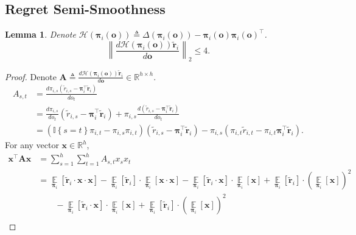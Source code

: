 \documentclass[10pt]{article}
\def\rvo{{\mathbf{o}}}
\def\rvx{{\mathbf{x}}}
\def\rvo{{\mathbf{o}}}
\def\rvtilder{{\tilde{\mathbf{r}}}}
\newtheorem{lem}{Lemma}
\def\rvpi{{\boldsymbol{\pi}}}
\def\rmA{{\mathbf{A}}}
\def\sE{{\mathbb{E}}}
\def\sR{{\mathbb{R}}}
\def\sI{{\mathbb{I}}}
\def\gH{{\mathcal{H}}}
\DeclareMathOperator*{\expectation}{\sE}
\begin{document}
\subsection{Regret Semi-Smoothness}

\begin{lem}
    Denote $\gH\left( \rvpi_i \left(\rvo \right) \right) \triangleq \Delta \left( \rvpi_i \left(\rvo \right) \right) - \rvpi_i \left(\rvo \right) \rvpi_i \left(\rvo \right)^\top$.
\begin{equation*}
    \left\| \frac{d \gH\left( \rvpi_i \left(\rvo \right) \right) \rvtilder_i}{d \rvo } \right\|_2 \le 4.
\end{equation*}
\end{lem}
\begin{proof}
    Denote $\rmA \triangleq \frac{d \gH\left( \rvpi_i \left(\rvo \right) \right) \rvtilder_i}{d \rvo } \in \sR^{h \times h}$.
\begin{equation*}
\begin{split}
    A_{s, t} &= \frac{d \pi_{i,s} \left( \tilde{r}_{i,s} - \rvpi_i^\top \rvtilder_i \right) }{d o_t} \\
    &= \frac{d \pi_{i,s} }{d o_t} \left( \tilde{r}_{i,s} - \rvpi_i^\top \rvtilder_i \right) + \pi_{i,s} \frac{d \left( \tilde{r}_{i,s} - \rvpi_i^\top \rvtilder_i \right) }{d o_t} \\
    &=\left ( \sI\left\{ s = t\right\} \pi_{i,t} -  \pi_{i,s } \pi_{i,t} \right) \left( \tilde{r}_{i,s} - \rvpi_i^\top \rvtilder_i \right) - \pi_{i,s} \left( \pi_{i,t} \tilde{r}_{i,t} - \pi_{i,t} \rvpi_i^\top \rvtilder_i \right).
\end{split}
\end{equation*}
For any vector $\rvx \in \sR^h$, 
\begin{equation*}
\begin{split}
    \rvx^\top \rmA \rvx &= \sum\limits_{s=1}^{h}{ \sum\limits_{t=1}^{h}{ A_{s,t} x_s x_t} } \\
    &= \expectation\limits_{\rvpi_i}\left[ \rvtilder_i \cdot \rvx \cdot \rvx \right] - \expectation\limits_{\rvpi_i}\left[ \rvtilder_i \right] \cdot \expectation\limits_{\rvpi_i}\left[ \rvx \cdot \rvx \right] - \expectation\limits_{\rvpi_i}\left[ \rvtilder_i \cdot \rvx \right] \cdot \expectation\limits_{\rvpi_i}\left[ \rvx \right] + \expectation\limits_{\rvpi_i}\left[ \rvtilder_i \right] \cdot \left( \expectation\limits_{\rvpi_i}\left[ \rvx \right] \right)^2 \\
    &\qquad - \expectation\limits_{\rvpi_i}\left[ \rvtilder_i \cdot \rvx \right] \cdot \expectation\limits_{\rvpi_i}\left[ \rvx \right] + \expectation\limits_{\rvpi_i}\left[ \rvtilder_i \right] \cdot \left( \expectation\limits_{\rvpi_i}\left[ \rvx \right] \right)^2 \\

\end{split}
\end{equation*}
\end{proof}
\end{document}
